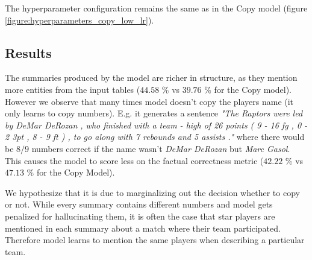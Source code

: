The hyperparameter configuration remains the same as in the Copy model (figure \ref{figure:hyperparameters_copy_low_lr}).

\subsection{Results}

The summaries produced by the model are richer in structure, as they mention more entities from the input tables ($44.58$ \% vs $39.76$ \% for the Copy model). However we observe that many times model doesn't copy the players name (it only learns to copy numbers). E.g. it generates a sentence \emph{"The Raptors were led by DeMar DeRozan , who finished with a team - high of 26 points ( 9 - 16 fg , 0 - 2 3pt , 8 - 9 ft ) , to go along with 7 rebounds and 5 assists ."} where there would be $8 / 9$ numbers correct if the name wasn't \emph{DeMar DeRozan} but \emph{Marc Gasol}. This causes the model to score less on the factual correctness metric ($42.22$ \% vs $47.13$ \% for the Copy Model).

We hypothesize that it is due to marginalizing out the decision whether to copy or not. While every summary contains different numbers and model gets penalized for hallucinating them, it is often the case that star players are mentioned in each summary about a match where their team participated. Therefore model learns to mention the same players when describing a particular team.

\begin{table}[h]
    \centering
    \caption{Performance metrics on the joint-copy model with content selection encoder.} \label{table:metrics_copy_content_selection}
\end{table}

